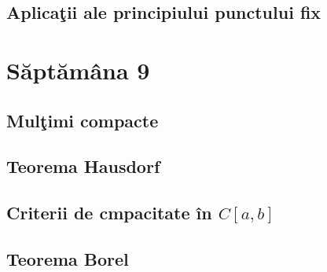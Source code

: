 \documentclass[a4paper,12pt]{article}
\theoremstyle{change}
\begin{document}
\subsection{Aplicaţii ale principiului  punctului fix}

\section{Săptămâna 9}


\subsection{Mulţimi compacte}

\subsection{Teorema Hausdorf}


\subsection{Criterii de cmpacitate în $C[a,b]$}

\subsection{Teorema Borel}
\end{document}
